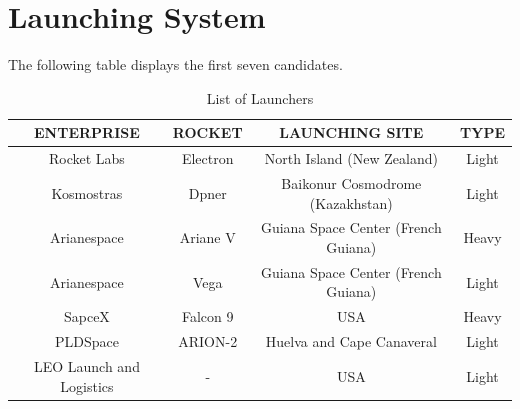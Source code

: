 \section{Launching System}

The following table displays the first seven candidates. 

	\begin{table}[H]
	\begin{center}
	\begin{tabular}{|c|c|c|c|}
	\hline
	\bf{ENTERPRISE} & \bf{ROCKET} & \bf{LAUNCHING SITE} & \bf{TYPE}  \\
	\hline 
	Rocket Labs & Electron & North Island (New Zealand) & Light \\
	\hline 
	Kosmostras & Dpner & Baikonur Cosmodrome (Kazakhstan) & Light\\
	\hline 
	Arianespace & Ariane V & Guiana Space Center (French Guiana) & Heavy \\
	\hline
	 Arianespace & Vega & Guiana Space Center (French Guiana) & Light\\
	\hline 
	SapceX & Falcon 9 & USA & Heavy \\
	\hline 
	PLDSpace & ARION-2 & Huelva and Cape Canaveral & Light\\
	\hline 
	LEO Launch and Logistics & - & USA & Light \\
	\hline
	\end{tabular}
	\end{center}
	\caption{List of Launchers}
	\end{table} 
	
